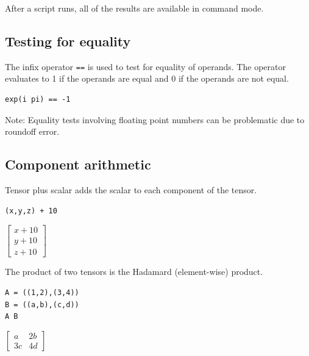 \documentclass[12pt]{article}
\begin{document}
After a script runs, all of the results are available in command mode.

\newpage





\subsection{Testing for equality}
The infix operator \verb$==$ is used to test for equality of operands.
The operator evaluates to 1 if the operands are equal and 0 if the operands are not equal.

\begin{Verbatim}[formatcom=\color{blue}]
exp(i pi) == -1
\end{Verbatim}


\bigskip
\noindent
Note: Equality tests involving floating point numbers
can be problematic due to roundoff error.











\subsection{Component arithmetic}

\noindent
Tensor plus scalar adds the scalar to each component of the tensor.

{\color{blue}\begin{verbatim}
(x,y,z) + 10
\end{verbatim}}

\noindent
$\displaystyle
\begin{bmatrix}
x+10
\\[1ex]
y+10
\\[1ex]
z+10
\end{bmatrix}
$

\bigskip
\noindent
The product of two tensors is the Hadamard (element-wise) product.

{\color{blue}\begin{verbatim}
A = ((1,2),(3,4))
B = ((a,b),(c,d))
A B
\end{verbatim}}

\noindent
$\displaystyle
\begin{bmatrix}
a & 2b
\\[1ex]
3c & 4d
\end{bmatrix}
$
\end{document}
